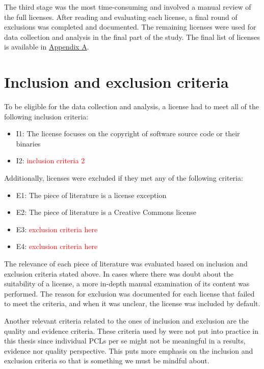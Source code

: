 The third stage was the most time-consuming and involved a manual review of the full licenses. After reading and evaluating each license, a final round of exclusions was completed and documented. The remaining licenses were used for data collection and analysis in the final part of the study. The final list of licenses is available in \hyperref[appendix:A]{Appendix A}.

\section{Inclusion and exclusion criteria}
To be eligible for the data collection and analysis, a license had to meet all of the following inclusion criteria:

\begin{itemize}
	\item I1: The license focuses on the copyright of software source code or their binaries
	\item I2: \textcolor{red}{inclusion criteria 2}
\end{itemize}

Additionally, licenses were excluded if they met any of the following criteria:

\begin{itemize}
	\item E1: The piece of literature is a license exception
	\item E2: The piece of literature is a Creative Commons license
	\item E3: \textcolor{red}{exclusion criteria here}
	\item E4: \textcolor{red}{exclusion criteria here}
\end{itemize}

The relevance of each piece of literature was evaluated based on inclusion and exclusion criteria stated above. In cases where there was doubt about the suitability of a license, a more in-depth manual examination of its content was performed. The reason for exclusion was documented for each license that failed to meet the criteria, and when it was unclear, the license was included by default.

Another relevant criteria related to the ones of inclusion and exclusion are the quality and evidence criteria. These criteria used by \cite{dyba2007} were not put into practice in this thesis since individual PCLs per se might not be meaningful in a results, evidence nor quality perspective. This puts more emphasis on the inclusion and exclusion criteria so that is something we must be mindful about.

